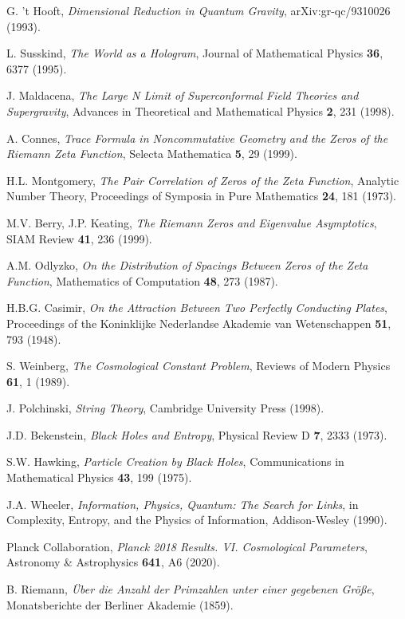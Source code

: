 \documentclass[12pt]{article}
\begin{document}
\begin{thebibliography}{99}

 G. 't Hooft, \emph{Dimensional Reduction in Quantum Gravity}, arXiv:gr-qc/9310026 (1993).

 L. Susskind, \emph{The World as a Hologram}, Journal of Mathematical Physics \textbf{36}, 6377 (1995).

 J. Maldacena, \emph{The Large N Limit of Superconformal Field Theories and Supergravity}, Advances in Theoretical and Mathematical Physics \textbf{2}, 231 (1998).

 A. Connes, \emph{Trace Formula in Noncommutative Geometry and the Zeros of the Riemann Zeta Function}, Selecta Mathematica \textbf{5}, 29 (1999).

 H.L. Montgomery, \emph{The Pair Correlation of Zeros of the Zeta Function}, Analytic Number Theory, Proceedings of Symposia in Pure Mathematics \textbf{24}, 181 (1973).

 M.V. Berry, J.P. Keating, \emph{The Riemann Zeros and Eigenvalue Asymptotics}, SIAM Review \textbf{41}, 236 (1999).

 A.M. Odlyzko, \emph{On the Distribution of Spacings Between Zeros of the Zeta Function}, Mathematics of Computation \textbf{48}, 273 (1987).

 H.B.G. Casimir, \emph{On the Attraction Between Two Perfectly Conducting Plates}, Proceedings of the Koninklijke Nederlandse Akademie van Wetenschappen \textbf{51}, 793 (1948).

 S. Weinberg, \emph{The Cosmological Constant Problem}, Reviews of Modern Physics \textbf{61}, 1 (1989).

 J. Polchinski, \emph{String Theory}, Cambridge University Press (1998).

 J.D. Bekenstein, \emph{Black Holes and Entropy}, Physical Review D \textbf{7}, 2333 (1973).

 S.W. Hawking, \emph{Particle Creation by Black Holes}, Communications in Mathematical Physics \textbf{43}, 199 (1975).

 J.A. Wheeler, \emph{Information, Physics, Quantum: The Search for Links}, in Complexity, Entropy, and the Physics of Information, Addison-Wesley (1990).

 Planck Collaboration, \emph{Planck 2018 Results. VI. Cosmological Parameters}, Astronomy \& Astrophysics \textbf{641}, A6 (2020).

 B. Riemann, \emph{Über die Anzahl der Primzahlen unter einer gegebenen Größe}, Monatsberichte der Berliner Akademie (1859).

\end{thebibliography}
\end{document}
